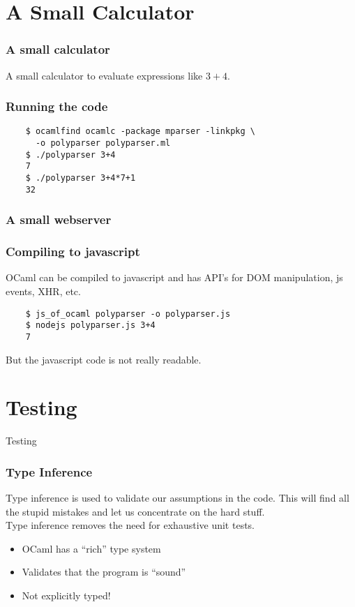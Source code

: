 \documentclass[xcolor=svgnames]{beamer}
\renewcommand{\_}{\mathunderscore}
\begin{document}
\section{A Small Calculator}
\begin{frame}[fragile]
  \frametitle{A small calculator}
  A small calculator to evaluate expressions like $3 + 4$.
  \pause
  
\end{frame}

\begin{frame}[fragile]
  \frametitle{Running the code}
  \begin{lstlisting}
    $ ocamlfind ocamlc -package mparser -linkpkg \
      -o polyparser polyparser.ml
    $ ./polyparser 3+4
    7
    $ ./polyparser 3+4*7+1
    32
  \end{lstlisting}
\end{frame}

\begin{frame}[fragile]
  \frametitle{A small webserver}
  
\end{frame}

\begin{frame}[fragile]
  \frametitle{Compiling to javascript}
  OCaml can be compiled to javascript and has API's for DOM
  manipulation, js events, XHR, etc.

  \begin{lstlisting}
    $ js_of_ocaml polyparser -o polyparser.js
    $ nodejs polyparser.js 3+4
    7
  \end{lstlisting}
  \pause
  But the javascript code is not really readable.
\end{frame}

\section{Testing}
\begin{frame}[fragile]
  \begin{center}
    \Huge Testing
  \end{center}
\end{frame}

\begin{frame}[fragile]
  \frametitle{Type Inference}
  Type inference is used to validate our assumptions in the code. This
  will find all the stupid mistakes and let us concentrate on the hard
  stuff.\newline\\
  \pause
  Type inference removes the need for exhaustive unit tests.\newline
  \pause
  \begin{itemize}
    \item OCaml has a ``rich'' type system
    \item Validates that the program is ``sound''
    \item Not explicitly typed!
  \end{itemize}
\end{frame}
\end{document}
